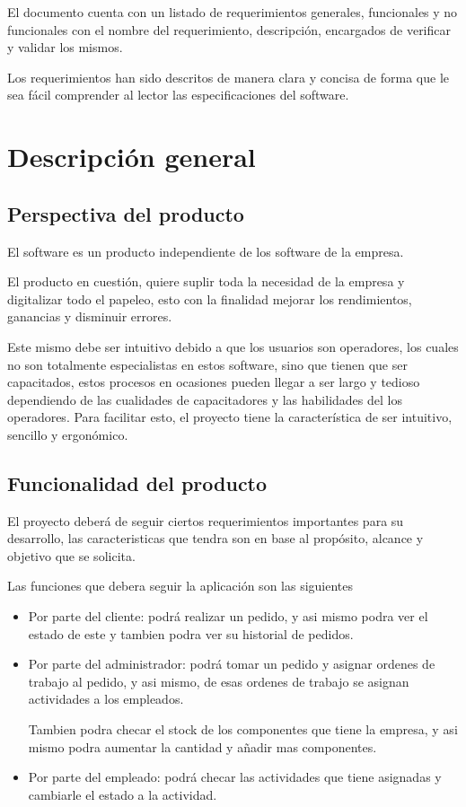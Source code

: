\documentclass[12pt,a4paper, twosite]{article}
\begin{document}
El documento cuenta con un listado de requerimientos generales, funcionales y no
funcionales con el nombre del requerimiento, descripción, encargados de verificar y validar los mismos.

Los requerimientos han sido descritos de manera clara y concisa de forma que le
sea fácil comprender al lector las especificaciones del software.

\section{Descripción general}
\label{sec:orgc1c4017}
\subsection{Perspectiva del producto}
\label{sec:org24980a8}
El software es un producto independiente de los software de la empresa.

El producto en cuestión, quiere suplir toda la necesidad de la empresa y digitalizar todo el papeleo, esto con la finalidad mejorar los rendimientos, ganancias y disminuir errores.

Este mismo debe ser intuitivo debido a que los usuarios son operadores, los cuales no son totalmente especialistas en estos software, sino que tienen que ser capacitados, estos procesos en ocasiones pueden llegar a ser largo y tedioso dependiendo de las cualidades de capacitadores y las habilidades del los operadores. Para facilitar esto, el proyecto tiene la característica de ser intuitivo, sencillo y ergonómico.



\subsection{Funcionalidad del producto}
\label{sec:orgaf51da6}

El proyecto deberá de seguir ciertos requerimientos importantes para su desarrollo, las caracteristicas que tendra son en base al propósito, alcance y objetivo que se solicita.

Las funciones que debera seguir la aplicación son las siguientes
\begin{itemize}
    \item Por parte del cliente: podrá realizar un pedido, y asi mismo podra ver el estado de este y tambien podra ver su historial de pedidos.
    \item Por parte del administrador: podrá tomar un pedido y asignar ordenes de trabajo al pedido, y asi mismo, de esas ordenes de trabajo se asignan actividades a los empleados.

    Tambien podra checar el stock de los componentes que tiene la empresa, y asi mismo podra aumentar la cantidad y añadir mas componentes.
    \item Por parte del empleado: podrá checar las actividades que tiene asignadas y cambiarle el estado a la actividad.
\end{itemize}
\end{document}
